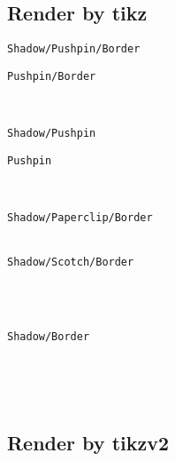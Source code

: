 \documentclass[english,a4paper,11pt]{article}
\begin{document}
\pagebreak

\subsection{Render by tikz}

\begin{DemoCode}
\hfill\begin{PostItNote}[Render=tikz]
\texttt{Shadow/Pushpin/Border}
\end{PostItNote}
\begin{PostItNote}[Shadow=false,Render=tikz]
\texttt{Pushpin/Border}
\end{PostItNote}\hfill~

\medskip

\hfill\begin{PostItNote}[Border=false,Render=tikz]
\texttt{Shadow/Pushpin}
\end{PostItNote}
\begin{PostItNote}[Border=false,Shadow=false,Render=tikz]
\texttt{Pushpin}
\end{PostItNote}\hfill~

\medskip

\hfill\begin{PostItNote}[Pin=Paperclip,Render=tikz]
\texttt{Shadow/Paperclip/Border}\\
~
\end{PostItNote}
\begin{PostItNote}[Pin=Scotch,Render=tikz]
\texttt{Shadow/Scotch/Border}\\
~
\end{PostItNote}\hfill~

\medskip

\hfill\begin{PostItNote}[Pin=None,Render=tikz]
\texttt{Shadow/Border}
\end{PostItNote}\hfill~

\vspace{1cm}

\hfill\begin{PostItNote}[Render=tikz,Title={Lipsum[1][1-4]},FontTitle={\large\sffamily},Rotate=5,Color=pink,Height=6cm,Pin=Scotch,AlignV=center,Corner]
\lipsum[1][1-4]
\end{PostItNote}\hfill~
\end{DemoCode}

\subsection{Render by tikzv2}
\end{document}
